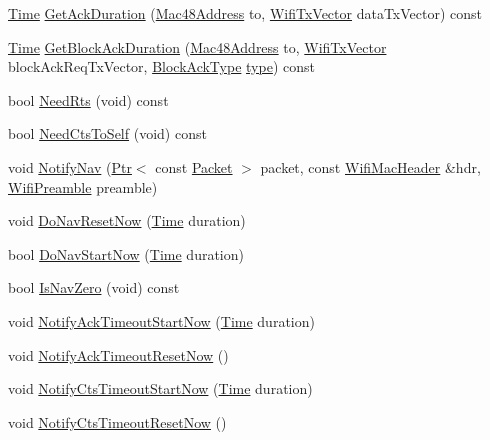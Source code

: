 \begin{DoxyCompactItemize}
\item 
\hyperlink{classns3_1_1Time}{Time} \hyperlink{classns3_1_1MacLow_a014e154f9f037102d3c7662a83479bbb}{Get\+Ack\+Duration} (\hyperlink{classns3_1_1Mac48Address}{Mac48\+Address} to, \hyperlink{classns3_1_1WifiTxVector}{Wifi\+Tx\+Vector} data\+Tx\+Vector) const 
\item 
\hyperlink{classns3_1_1Time}{Time} \hyperlink{classns3_1_1MacLow_a53da988c70ab1519958159aea9c969c3}{Get\+Block\+Ack\+Duration} (\hyperlink{classns3_1_1Mac48Address}{Mac48\+Address} to, \hyperlink{classns3_1_1WifiTxVector}{Wifi\+Tx\+Vector} block\+Ack\+Req\+Tx\+Vector, \hyperlink{namespacens3_a90f436472d19d7d7f37cbf0b8c288ff7}{Block\+Ack\+Type} \hyperlink{visualizer-ideas_8txt_add98db9e15e2a58cf2b57623e7aa893a}{type}) const 
\item 
bool \hyperlink{classns3_1_1MacLow_abb03703a2f28b39d0cff52ce8488f7b3}{Need\+Rts} (void) const 
\item 
bool \hyperlink{classns3_1_1MacLow_a8522fde99dc6efe05a667a3e3ebd9b5a}{Need\+Cts\+To\+Self} (void) const 
\item 
void \hyperlink{classns3_1_1MacLow_a6ff5bbb311cf902d961bf6871f2929d0}{Notify\+Nav} (\hyperlink{classns3_1_1Ptr}{Ptr}$<$ const \hyperlink{classns3_1_1Packet}{Packet} $>$ packet, const \hyperlink{classns3_1_1WifiMacHeader}{Wifi\+Mac\+Header} \&hdr, \hyperlink{group__wifi_ga5e94a56cb338a14ffbbb19c6a41251eb}{Wifi\+Preamble} preamble)
\item 
void \hyperlink{classns3_1_1MacLow_abcc34d5e7e18f1f9df32adb248efccea}{Do\+Nav\+Reset\+Now} (\hyperlink{classns3_1_1Time}{Time} duration)
\item 
bool \hyperlink{classns3_1_1MacLow_ab35a898f608bb1103394e56a77c01343}{Do\+Nav\+Start\+Now} (\hyperlink{classns3_1_1Time}{Time} duration)
\item 
bool \hyperlink{classns3_1_1MacLow_a41988b43a8e4d1805c5bee02e88f7811}{Is\+Nav\+Zero} (void) const 
\item 
void \hyperlink{classns3_1_1MacLow_acde3a1447ef79fa1bc3456b3d0473757}{Notify\+Ack\+Timeout\+Start\+Now} (\hyperlink{classns3_1_1Time}{Time} duration)
\item 
void \hyperlink{classns3_1_1MacLow_a6efebdcb2cfbfb98f184587e0ffac4a8}{Notify\+Ack\+Timeout\+Reset\+Now} ()
\item 
void \hyperlink{classns3_1_1MacLow_ad4e0eee50d12b8b7e22ad6b68ffb82ef}{Notify\+Cts\+Timeout\+Start\+Now} (\hyperlink{classns3_1_1Time}{Time} duration)
\item 
void \hyperlink{classns3_1_1MacLow_a4a5811d6177046db69e71af9dfc5cb0f}{Notify\+Cts\+Timeout\+Reset\+Now} ()

\end{DoxyCompactItemize}
